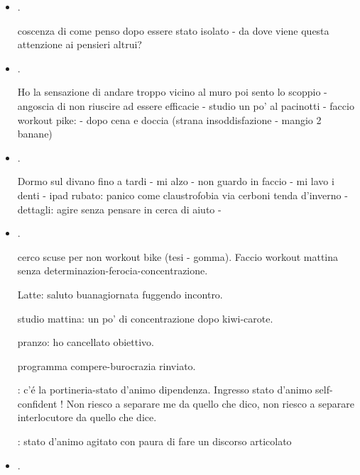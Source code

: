 \begin{itemize}
stanchezza-rilassata-palpitazioni-spasmi esofagei-mi manca la siesta-distanza me-mondo in senso paralizzante

\item {}.

coscenza di come penso dopo essere stato isolato - da dove viene questa attenzione ai pensieri altrui?


\item {}.

Ho la sensazione di andare troppo vicino al muro poi sento lo scoppio - angoscia di non riuscire ad essere efficacie - studio un po' al pacinotti - faccio workout pike:  - dopo cena e doccia (strana insoddisfazione - mangio 2 banane) 

\item {}.

Dormo sul divano fino a tardi - mi alzo - non guardo in faccio - mi lavo i denti - ipad rubato: panico come claustrofobia via cerboni tenda d'inverno - dettagli: agire senza pensare in cerca di aiuto  - 



\item {}.

cerco scuse per non workout bike (tesi - gomma). Faccio workout mattina senza determinazion-ferocia-concentrazione.

Latte: saluto buanagiornata fuggendo incontro.

studio mattina: un po' di concentrazione dopo kiwi-carote.

pranzo: ho cancellato obiettivo.

programma compere-burocrazia rinviato.

: c'\'e la portineria-stato d'animo dipendenza. Ingresso stato d'animo self-confident
! Non riesco a separare me da quello che dico, non riesco a separare interlocutore da quello che dice.

: stato d'animo agitato con paura di fare un discorso articolato

\item {}.


\end{itemize}

